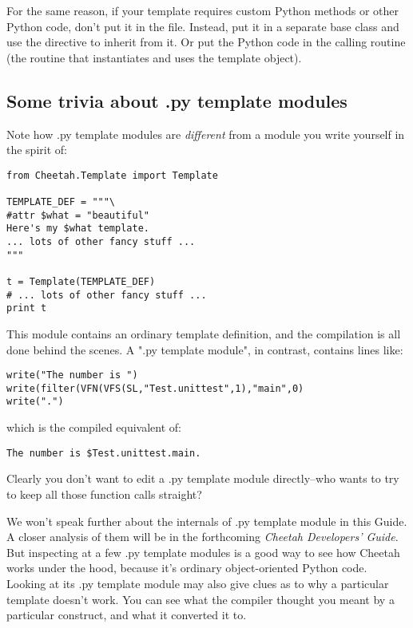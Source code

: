 For the same reason, if your template requires custom Python methods or
other Python code, don't put it in the  file.  Instead, put
it in a separate base class and use the  directive to
inherit from it.  Or put the Python code in the calling routine (the routine
that instantiates and uses the template object).

\subsection{Some trivia about .py template modules}
\label{howWorks.pyTrivia}

Note how .py template modules are {\em different} from a module you write
yourself in the spirit of:

\begin{verbatim}
from Cheetah.Template import Template

TEMPLATE_DEF = """\
#attr $what = "beautiful"
Here's my $what template.
... lots of other fancy stuff ...
"""

t = Template(TEMPLATE_DEF)
# ... lots of other fancy stuff ...
print t
\end{verbatim}

This module contains an ordinary template definition, and the compilation is
all done behind the scenes.  A ".py template module", in contrast, contains
lines like:

\begin{verbatim}
write("The number is ")  
write(filter(VFN(VFS(SL,"Test.unittest",1),"main",0)
write(".")
\end{verbatim}

which is the compiled equivalent of:

\begin{verbatim}
The number is $Test.unittest.main.
\end{verbatim}

Clearly you don't want to edit a .py template module directly--who wants
to try to keep all those function calls straight?

We won't speak further about the internals of .py template module in this
Guide.  A closer analysis of them will be in the forthcoming {\em Cheetah
Developers' Guide}.  But inspecting at a few .py template modules is a good way
to see how Cheetah works under the hood, because it's ordinary object-oriented
Python code.  Looking at its .py template module may also give clues as to
why a particular template doesn't work.  You can see what the compiler 
thought you meant by a particular construct, and what it converted it to.

